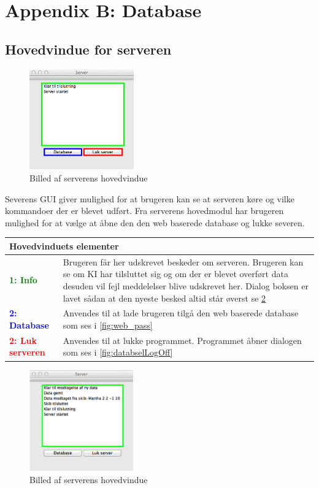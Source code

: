 \chapter*{Appendix B: Database}
\section*{Hovedvindue for serveren}
\begin{figure}[htbp]
	\centering
	\includegraphics[width=0.4\textwidth]{billeder/database/server}
	\caption{Billed af serverens hovedvindue}
	\label{fig:server}
\end{figure}
Severens GUI giver mulighed for at brugeren kan se at serveren køre og vilke kommandoer der er blevet udført. Fra serverens hovedmodul har brugeren mulighed for at vælge at åbne den den web baserede database og lukke severen.
\begin{table}[H]
\begin{tabular}{l p{12.5cm}}
\multicolumn{2}{l}{Hovedvinduets elementer} \\
\hline
\textcolor{green}{\textbf{1: Info}}
&Brugeren får her udskrevet beskeder om serveren. Brugeren kan se om KI har tilsluttet sig og om der er blevet overført data desuden vil fejl meddelelser blive udskrevet her. Dialog boksen er lavet sådan at den nyeste besked altid står øverst se \ref{fig:server_on}\\

\textcolor{blue}{\textbf{2: Database}}
&Anvendes til at lade brugeren tilgå den web baserede database som ses i \ref{fig:web_pass}\\

\textcolor{red}{\textbf{2: Luk serveren}}
&Anvendes til at lukke programmet. Programmet åbner dialogen som ses i \ref{fig:databselLogOff}\\

\end{tabular}
\end{table}

\begin{figure}[htbp]
	\centering
	\includegraphics[width=0.4\textwidth]{billeder/database/server_on}
	\caption{Billed af serverens hovedvindue}
	\label{fig:server_on}
\end{figure}


